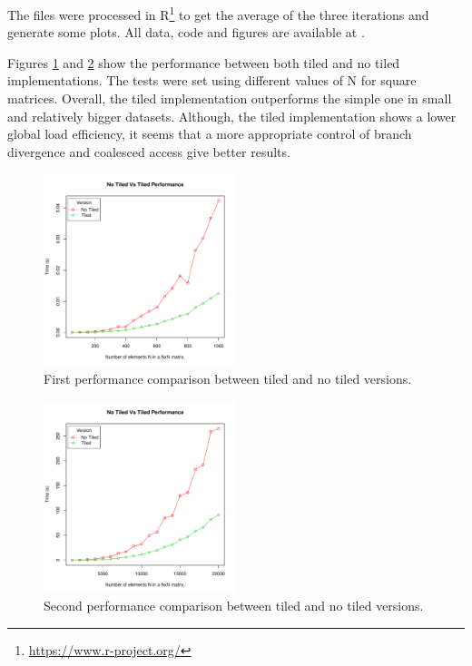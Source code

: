 \documentclass[a4paper,10pt]{scrartcl}
\begin{document}
\begin{enumerate}
The files were processed in R\footnote{\url{https://www.r-project.org/}} to get the average of the three iterations and generate some plots. All data, code and figures are available at \cite{github}.

Figures \ref{fig:NTVsT_50-1K} and \ref{fig:NTVsT_1K-20K} show the performance between both tiled and no tiled implementations.  The tests were set using different values of N for square matrices. Overall, the tiled implementation outperforms the simple one in small and relatively bigger datasets.  Although, the tiled implementation shows a lower global load efficiency, it seems that a more appropriate control of branch divergence and coalesced access give better results. 

 \begin{figure}
 \centering
 \includegraphics[width=0.5\textwidth]{./NTVsT_50-1K}
 \caption{First performance comparison between tiled and no tiled versions.}\label{fig:NTVsT_50-1K}
 \end{figure}

 \begin{figure}
 \centering
 \includegraphics[width=0.5\textwidth]{./NTVsT_1K-20K}
 \caption{Second performance comparison between tiled and no tiled versions.}\label{fig:NTVsT_1K-20K}
 \end{figure}


\end{enumerate}
\end{document}
